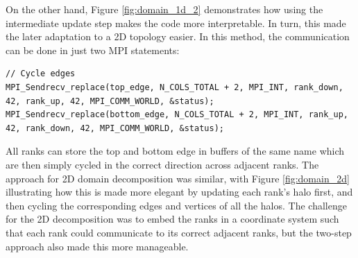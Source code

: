 \documentclass[12pt]{article}
\begin{document}
On the other hand, Figure \ref{fig:domain_1d_2} demonstrates how using the intermediate update step makes the code more interpretable.
In turn, this made the later adaptation to a 2D topology easier.
In this method, the communication can be done in just two MPI statements:

\begin{lstlisting}
// Cycle edges
MPI_Sendrecv_replace(top_edge, N_COLS_TOTAL + 2, MPI_INT, rank_down, 42, rank_up, 42, MPI_COMM_WORLD, &status);
MPI_Sendrecv_replace(bottom_edge, N_COLS_TOTAL + 2, MPI_INT, rank_up, 42, rank_down, 42, MPI_COMM_WORLD, &status);
\end{lstlisting}

All ranks can store the top and bottom edge in buffers of the same name which are then simply cycled in the correct direction across adjacent ranks.
The approach for 2D domain decomposition was similar, with Figure \ref{fig:domain_2d} illustrating how this is made more elegant by updating each rank's halo first,
and then cycling the corresponding edges and vertices of all the halos.
The challenge for the 2D decomposition was to embed the ranks in a coordinate system such that each rank could communicate to its correct adjacent ranks,
but the two-step approach also made this more manageable.
\end{document}

